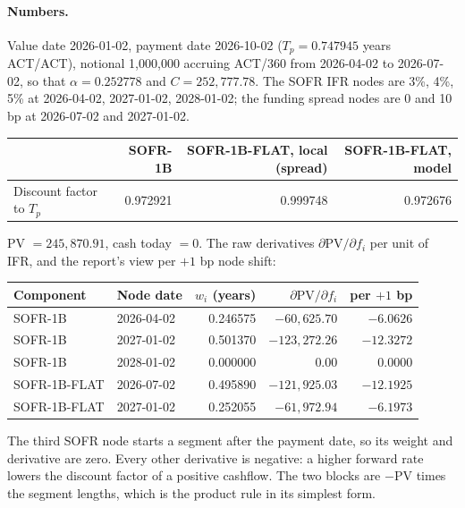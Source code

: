 \documentclass[11pt]{article}
\begin{document}
\paragraph{Numbers.}
Value date 2026-01-02, payment date 2026-10-02 ($T_p=0.747945$ years ACT/ACT), notional 1{,}000{,}000 accruing ACT/360 from 2026-04-02 to 2026-07-02, so that $\alpha=0.252778$ and $C=252{,}777.78$. The SOFR IFR nodes are 3\%, 4\%, 5\% at 2026-04-02, 2027-01-02, 2028-01-02; the funding spread nodes are 0 and 10 bp at 2026-07-02 and 2027-01-02.
\begin{center}
\begin{tabular}{@{}lrrr@{}}
\toprule
 & SOFR-1B & SOFR-1B-FLAT, local (spread) & SOFR-1B-FLAT, model \\
\midrule
Discount factor to $T_p$ & 0.972921 & 0.999748 & 0.972676 \\
\bottomrule
\end{tabular}
\end{center}
PV $=245{,}870.91$, cash today $=0$. The raw derivatives $\partial\mathrm{PV}/\partial f_i$ per unit of IFR, and the report's view per $+1$ bp node shift:
\begin{center}
\begin{tabular}{@{}llrrr@{}}
\toprule
Component & Node date & $w_i$ (years) & $\partial\mathrm{PV}/\partial f_i$ & per $+1$ bp \\
\midrule
SOFR-1B & 2026-04-02 & 0.246575 & $-60{,}625.70$ & $-6.0626$ \\
SOFR-1B & 2027-01-02 & 0.501370 & $-123{,}272.26$ & $-12.3272$ \\
SOFR-1B & 2028-01-02 & 0.000000 & $0.00$ & $0.0000$ \\
SOFR-1B-FLAT & 2026-07-02 & 0.495890 & $-121{,}925.03$ & $-12.1925$ \\
SOFR-1B-FLAT & 2027-01-02 & 0.252055 & $-61{,}972.94$ & $-6.1973$ \\
\bottomrule
\end{tabular}
\end{center}
The third SOFR node starts a segment after the payment date, so its weight and derivative are zero. Every other derivative is negative: a higher forward rate lowers the discount factor of a positive cashflow. The two blocks are $-\mathrm{PV}$ times the segment lengths, which is the product rule in its simplest form.
\end{document}
